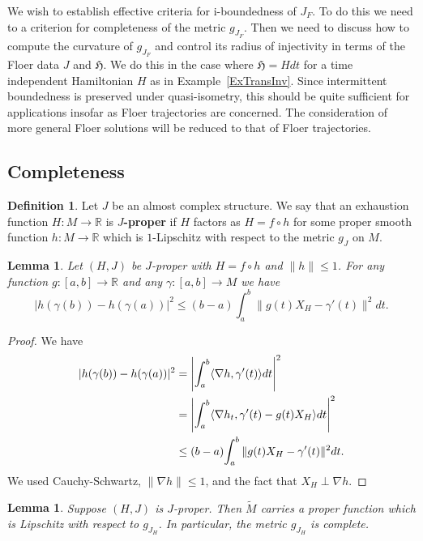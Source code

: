 \documentclass[11pt]{amsart}
\newcommand{\R}{\mathbb{R}}
\newtheorem{lm}[tm]{Lemma}
\theoremstyle{definition}
\newtheorem{df}[tm]{Definition}
\theoremstyle{remark}
\begin{document}
We wish to establish effective criteria for i-boundedness of $J_F$. To do this we need to a criterion for completeness of the metric $g_{J_F}$. Then we need to discuss how to compute the curvature of $g_{J_F}$ and control its radius of injectivity in terms of the Floer data $J$ and $\mathfrak{H}$. We do this in the case where $\mathfrak{H}=Hdt$ for a time independent Hamiltonian $H$  as in Example~\ref{ExTransInv}. Since intermittent boundedness is preserved under quasi-isometry, this should be quite sufficient for applications insofar as Floer trajectories are concerned. The consideration of more general Floer solutions will be reduced to that of Floer trajectories.
\subsection{Completeness}
\begin{df}
Let $J$ be an almost complex structure. We say that an exhaustion function $H:M\to\R$ is \textbf{$J$-proper} if $H$ factors as $H=f\circ h$ for some proper smooth function $h:M\to\R$ which is $1$-Lipschitz with respect to the metric $g_J$ on $M$.
\end{df}
\begin{lm}\label{lmStrPrpEst}
Let $(H,J)$ be $J$-proper with $H=f\circ h$ and $\|h\|\leq 1$. For any function $g:[a,b]\to \R$ and any $\gamma:[a,b]\to M$ we have
\[
|h(\gamma(b))-h(\gamma(a))|^2\leq (b-a)\int_a^b\|g(t)X_{H}-\gamma'(t)\|^2 dt.
\]
\end{lm}
\begin{proof}
We have
\begin{align}
|h(\gamma(b))-h(\gamma(a))|^2&=\left|\int_a^b\langle\nabla h,\gamma'(t)\rangle dt\right|^2\notag\\
&=\left|\int_a^b\langle\nabla h_t,\gamma'(t)-g(t)X_H\rangle dt\right|^2\notag\\
&\leq(b-a){\int_a^b\|g(t)X_{H}-\gamma'(t)\|^2 dt}\notag.
\end{align}
We used  Cauchy-Schwartz, $\|\nabla h\|\leq 1$, and the fact that $X_H\perp\nabla h$.
\end{proof}
\begin{lm}\label{tmGradFacComp}
Suppose $(H,J)$ is $J$-proper. Then $\tilde{M}$ carries a proper function which is Lipschitz with respect to $g_{J_H}$.
In particular, the metric $g_{J_H}$ is complete.
\end{lm}
\end{document}
